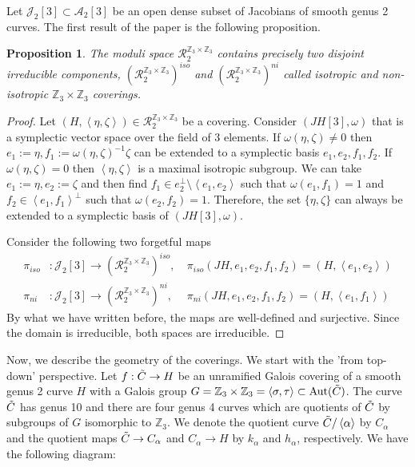 \documentclass{amsart}
\newtheorem{prop}[thm]{Proposition}
\theoremstyle{remark}
\numberwithin{equation}{section}
\newcommand{\cA}{\mathcal{A}}
\newcommand{\cJ}{\mathcal{J}}
\newcommand{\tC}{\Tilde{C}}
\DeclareMathOperator{\Aut}{Aut}
\begin{document}
Let $\cJ_2[3]\subset \cA_2[3]$ be an open dense subset of Jacobians of smooth genus 2 curves.
The first result of the paper is the following proposition.
\begin{prop}\label{moduli}
    The moduli space $\mathcal{R}_2^{\mathbb{Z}_3\times \mathbb{Z}_3}$ contains precisely two disjoint irreducible components, $(\mathcal{R}_2^{\mathbb{Z}_3\times \mathbb{Z}_3})^{iso}$ and $(\mathcal{R}_2^{\mathbb{Z}_3\times \mathbb{Z}_3})^{ni}$ called isotropic and non-isotropic $\mathbb{Z}_3\times \mathbb{Z}_3$ coverings.
\end{prop}
\begin{proof}
Let $(H,\left<\eta,\zeta\right>) \in \mathcal{R}_2^{\mathbb{Z}_3\times \mathbb{Z}_3}$ be a covering. Consider $(JH[3], \omega)$ that is a symplectic vector space over the field of 3 elements. If $\omega(\eta,\zeta)\neq0$ then $e_1 :=\eta, f_1 :=\omega(\eta,\zeta)^{-1}\zeta$ can be extended to a symplectic basis $e_1,e_2,f_1,f_2$. If $\omega(\eta,\zeta)=0$ then $\left<\eta,\zeta\right>$ is a maximal isotropic subgroup. We can take $e_1 :=\eta, e_2 :=\zeta$ and then find $f_1\in e_2^{\perp}\setminus\left<e_1,e_2\right>$ such that $\omega(e_1,f_1)=1$ and $f_2\in \left<e_1,f_1\right>^{\perp}$ such that $\omega(e_2,f_2)=1$. Therefore, the set $\{\eta, \zeta\}$ can always be extended to a symplectic basis of $(JH[3], \omega)$.
    
    
    Consider the following two forgetful maps
    \begin{align*}
    \pi_{iso}&:\cJ_2[3]\to (\mathcal{R}_2^{\mathbb{Z}_3\times \mathbb{Z}_3})^{iso}, \ &\pi_{iso}(JH,e_1,e_2,f_1,f_2)=(H,\left<e_1,e_2\right>)\\
    \pi_{ni}&:\cJ_2[3]\to (\mathcal{R}_2^{\mathbb{Z}_3\times \mathbb{Z}_3})^{ni}, \ &\pi_{ni}(JH,e_1,e_2,f_1,f_2)=(H,\left<e_1,f_1\right>)    
    \end{align*}
        By what we have written before, the maps are well-defined and surjective. Since the domain is irreducible, both spaces are irreducible.
\end{proof}

Now, we describe the geometry of the coverings. We start with the 'from top-down' perspective. 
Let $f: \tC \to H$ be an unramified Galois covering of a smooth genus 2 curve $H$ with a Galois group $G = \mathbb{Z}_3 \times \mathbb{Z}_3 = \langle \sigma, \tau \rangle \subset \Aut(\tC)$. The curve $\tC$ has genus 10 and there are four genus 4 curves which are quotients of $\tC$ by subgroups of $G$ isomorphic to $\mathbb{Z}_3$. We denote the quotient curve $\tC/\left<\alpha\right>$ by $C_\alpha$ and the quotient maps $\tC \to C_{\alpha}$ and $C_{\alpha} \to H$ by $k_\alpha$ and $h_{\alpha}$, respectively. We have the following diagram:
\end{document}

